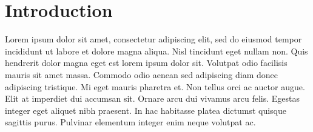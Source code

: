 


\section{Introduction}
\label{sec:introduction}
Lorem ipsum dolor sit amet, consectetur adipiscing elit, sed do eiusmod tempor incididunt ut labore et dolore magna aliqua. Nisl tincidunt eget nullam non. Quis hendrerit dolor magna eget est lorem ipsum dolor sit. Volutpat odio facilisis mauris sit amet massa. Commodo odio aenean sed adipiscing diam donec adipiscing tristique. Mi eget mauris pharetra et. Non tellus orci ac auctor augue. Elit at imperdiet dui accumsan sit. Ornare arcu dui vivamus arcu felis. Egestas integer eget aliquet nibh praesent. In hac habitasse platea dictumst quisque sagittis purus. Pulvinar elementum integer enim neque volutpat ac.

